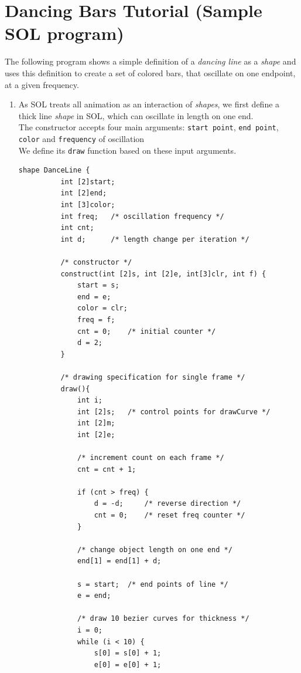 \documentclass[letterpaper,12pt]{report}
\begin{document}
  \section{Dancing Bars Tutorial (Sample SOL program)}
  The following program shows a simple definition of a \textit{dancing line} as a \textit{shape} and uses this definition to create a set of colored bars, that oscillate on one endpoint, at a given frequency.
  \begin{enumerate}
    \itemsep 0em
    \item As SOL treats all animation as an interaction of \textit{shapes}, we first define a thick line \textit{shape} in SOL, which can oscillate in length on one end.\\
    The constructor accepts four main arguments: \texttt{start point}, \texttt{end point}, \texttt{color} and \texttt{frequency} of oscillation\\
    We define its \texttt{draw} function based on these input arguments.\\

    \begin{lstlisting}[style=sol, aboveskip=1pt]
      shape DanceLine {
          int [2]start;
          int [2]end;
          int [3]color;
          int freq;   /* oscillation frequency */
          int cnt;
          int d;      /* length change per iteration */

          /* constructor */
          construct(int [2]s, int [2]e, int[3]clr, int f) {
              start = s;
              end = e;
              color = clr; 
              freq = f;   
              cnt = 0;    /* initial counter */
              d = 2;  
          }

          /* drawing specification for single frame */
          draw(){
              int i;
              int [2]s;   /* control points for drawCurve */
              int [2]m;
              int [2]e;

              /* increment count on each frame */
              cnt = cnt + 1;

              if (cnt > freq) {
                  d = -d;     /* reverse direction */
                  cnt = 0;    /* reset freq counter */
              }

              /* change object length on one end */
              end[1] = end[1] + d;

              s = start;  /* end points of line */
              e = end;

              /* draw 10 bezier curves for thickness */
              i = 0;
              while (i < 10) {
                  s[0] = s[0] + 1;
                  e[0] = e[0] + 1;


\end{lstlisting}
\end{enumerate}
\end{document}
